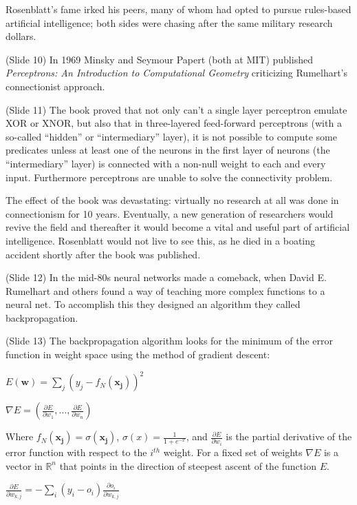 \documentclass[twocolumn]{article}
\begin{document}
Rosenblatt’s fame irked his peers, many of whom had opted to pursue rules-based
artificial intelligence; both sides were chasing after the same military
research dollars.

(Slide 10) In 1969 Minsky and Seymour Papert (both at MIT)
published \textit{Perceptrons: An Introduction to Computational Geometry}
criticizing Rumelhart's connectionist approach.

(Slide 11)  The book proved that not only can't a single layer perceptron
emulate XOR or XNOR, but also that in three-layered feed-forward perceptrons
(with a so-called  ``hidden'' or ``intermediary'' layer), it is not possible to
compute some predicates unless at least one of the neurons in the first layer of
neurons (the  ``intermediary'' layer) is connected with a non-null weight to
each and every input. Furthermore perceptrons are unable to solve the
connectivity problem.

The effect of the book was devastating: virtually no research at all was done
in connectionism for 10 years. Eventually, a new generation of researchers would
revive the field and thereafter it would become a vital and useful part of
artificial intelligence. Rosenblatt would not live to see this, as he died in a
boating accident shortly after the book was published.

(Slide 12) In the mid-80s neural networks made a comeback, when David
E. Rumelhart and others found a way of teaching more complex functions to a
neural net. To accomplish this they designed an algorithm they called
backpropagation.

(Slide 13) The backpropagation algorithm looks for the minimum of the error
function in weight space using the method of gradient descent:

\(E(\mathbf{w}) = \displaystyle\sum_{j} {(y_j - f_N(\mathbf{x_j}))}^2\)

\(\nabla E = (\frac{\partial E}{\partial w_{1}},\dotsc,\frac{\partial
  E}{\partial w_{n}})\)

Where \(f_N(\mathbf{x_j}) = \sigma(\mathbf{x_j})\), \(\sigma(x) =
\frac{1}{1+e^{-x}}\), and \(\frac{\partial E}{\partial w_{i}}\) is the partial
derivative of the error function with respect to the \(i^{th}\) weight. For a
fixed set of weights \(\nabla E\) is a vector in \(\mathbb{R}^n\) that points in
the direction of steepest ascent of the function \(E\).

\(\displaystyle \frac{\partial E}{\partial w_{k,j}} = -\sum_i (y_i -
o_i)\frac{\partial o_i}{\partial w_{k,j}}\)
\end{document}
